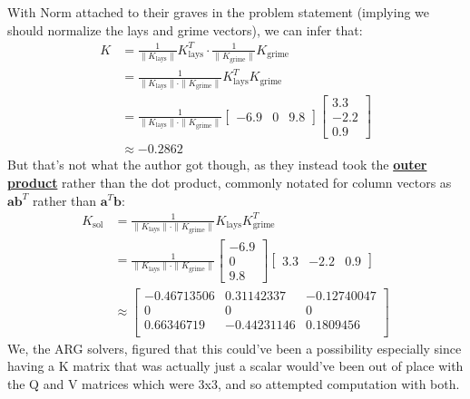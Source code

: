 \documentclass{article}
\begin{document}
With Norm attached to their graves in the problem statement (implying we should normalize the lays and grime vectors), we can infer that:
\begin{align*}
    K &= \frac{1}{\|K_\text{lays}\|}K_\text{lays}^T \cdot \frac{1}{\|K_\text{grime}\|}K_\text{grime}\\
    &= \frac{1}{\|K_\text{lays}\| \cdot \|K_\text{grime}\|}K_\text{lays}^T K_\text{grime}\\
    &= \frac{1}{\|K_\text{lays}\| \cdot \|K_\text{grime}\|} 
    \begin{bmatrix} -6.9 & 0 & 9.8\end{bmatrix}
    \begin{bmatrix} 3.3\\-2.2\\0.9\end{bmatrix}\\
    &\approx -0.2862
\end{align*}
But that's not what the author got though, as they instead took the \href{https://en.wikipedia.org/wiki/Outer_product}{\textbf{outer product}} rather than the dot product, commonly notated for column vectors as $\mathbf{ab}^T$ rather than $\mathbf{a}^T\mathbf{b}$:
\begin{align*}
    K_\text{sol} &= \frac{1}{\|K_\text{lays}\| \cdot \|K_\text{grime}\|}K_\text{lays} K_\text{grime}^T\\
    &= \frac{1}{\|K_\text{lays}\| \cdot \|K_\text{grime}\|} 
    \begin{bmatrix} -6.9 \\ 0 \\ 9.8\end{bmatrix}
    \begin{bmatrix} 3.3 &-2.2&0.9\end{bmatrix}\\
    &\approx \begin{bmatrix}
    -0.46713506 &  0.31142337 & -0.12740047 \\
     0          &  0          &  0          \\
     0.66346719 & -0.44231146 &  0.1809456  \\
    \end{bmatrix}
\end{align*}
We, the ARG solvers, figured that this could've been a possibility especially since having a K matrix that was actually just a scalar would've been out of place with the Q and V matrices which were 3x3, and so attempted computation with both.
\end{document}
